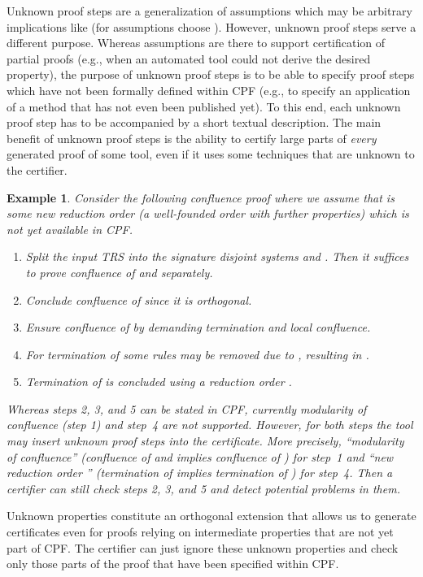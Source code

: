 \documentclass[USenglish]{eptcs}
\newtheorem{example}{Example}
\begin{document}
Unknown proof steps are a generalization of assumptions which may be arbitrary
implications like  (for
assumptions choose ).  However, unknown proof steps serve a different
purpose. Whereas assumptions are there to support certification of partial
proofs (e.g., when an automated tool could not derive the desired property), the
purpose of unknown proof steps is to be able to specify proof steps which have
not been formally defined within CPF (e.g., to specify an application of a
method that has not even been published yet). To this end, each unknown proof
step has to be accompanied by a short textual description.  The main benefit of
unknown proof steps is the ability to certify large parts of \emph{every}
generated proof of some tool, even if it uses some techniques that are unknown
to the certifier.
\begin{example}
Consider the following confluence proof where we assume that
 is some new reduction order (a well-founded order with further properties) 
which is not yet available in CPF.
\begin{enumerate}
\item
Split the input TRS  into the signature disjoint systems  and .
Then it suffices to prove confluence of  and  separately.

\item
Conclude confluence of  since it is orthogonal.

\item
Ensure confluence of  by demanding termination and local confluence.

\item
For termination of  some rules may be removed due to , resulting
in .

\item
Termination of  is concluded using a reduction order .
\end{enumerate}
Whereas steps 2, 3, and 5 can be stated in CPF, currently modularity of
confluence (step 1) and step~4 are not supported. However, for both steps the
tool may insert unknown proof steps into the certificate. More precisely,
``modularity of confluence'' (confluence of  and  implies
confluence of ) for step~1 and ``new reduction order ''
(termination of  implies termination of ) for step~4. Then a
certifier can still check steps 2, 3, and 5 and detect potential problems in
them.
\end{example}

Unknown properties constitute an orthogonal extension that allows us to generate
certificates even for proofs relying on intermediate properties that are not yet
part of CPF. The certifier can just ignore these unknown properties and check
only those parts of the proof that have been specified within CPF.
\end{document}
